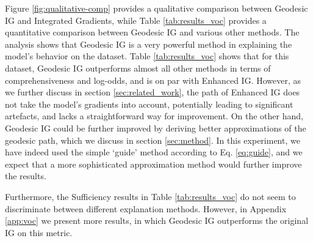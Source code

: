 \begin{table}[t]
	\centering
	\caption{Evaluation of different attribution methods on 100 randomly sampled images from the Pascal VOC test set. The metrics are computed by removing or keeping the top 5\% most important features. More results are provided in Appendix \ref{app:voc}.}
	\label{tab:results_voc}
\end{table}

Figure \ref{fig:qualitative-comp} provides a qualitative comparison between Geodesic IG and Integrated Gradients, while Table \ref{tab:results_voc} provides a quantitative comparison between Geodesic IG and various other methods. The analysis shows that Geodesic IG is a very powerful method in explaining the model's behavior on the dataset. Table \ref{tab:results_voc} shows that for this dataset, Geodesic IG outperforms almost all other methods in terms of comprehensiveness and log-odds, and is on par with Enhanced IG. However, as we further discuss in section \ref{sec:related_work}, the path of Enhanced IG does not take the model's gradients into account, potentially leading to significant artefacts, and lacks a straightforward way for improvement. On the other hand, Geodesic IG could be further improved by deriving better approximations of the geodesic path, which we discuss in section \ref{sec:method}. In this experiment, we have indeed used the simple `guide' method according to Eq. \ref{eq:guide}, and we expect that a more sophisticated approximation method would further improve the results.

Furthermore, the Sufficiency results in Table \ref{tab:results_voc} do not seem to discriminate between different explanation methods. However, in Appendix \ref{app:voc} we present more results, in which Geodesic IG outperforms the original IG on this metric.
